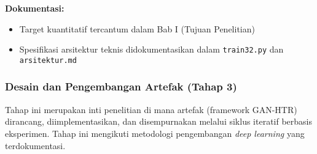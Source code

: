 \documentclass[12pt,a4paper]{article}
\begin{document}
\textbf{Dokumentasi:}
\begin{itemize}[leftmargin=*, nosep]
\item Target kuantitatif tercantum dalam Bab I (Tujuan Penelitian)
\item Spesifikasi arsitektur teknis didokumentasikan dalam \texttt{train32.py} dan \texttt{arsitektur.md}
\end{itemize}

\subsubsection{Desain dan Pengembangan Artefak (Tahap 3)}
\label{subsubsec:desain-pengembangan}

\setcounter{subsubsection}{2}
\setcounter{subparagraph}{0}

Tahap ini merupakan inti penelitian di mana artefak (framework GAN-HTR) dirancang, diimplementasikan, dan disempurnakan melalui siklus iteratif berbasis eksperimen. Tahap ini mengikuti metodologi pengembangan \textit{deep learning} yang terdokumentasi.
\end{document}
